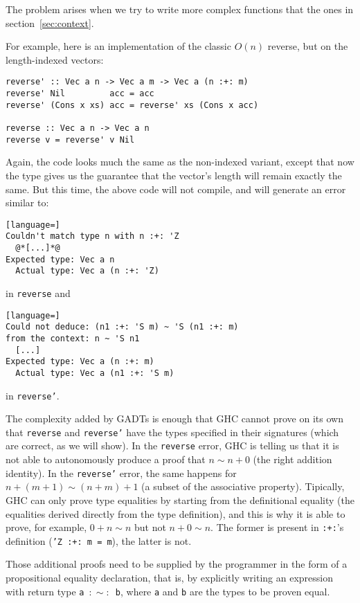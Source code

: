 The problem arises when we try to write more complex functions that the ones in section~\ref{sec:context}.

For example, here is an implementation of the classic $O(n)$ reverse, but on the length-indexed vectors:

\begin{lstlisting}
reverse' :: Vec a n -> Vec a m -> Vec a (n :+: m)
reverse' Nil         acc = acc
reverse' (Cons x xs) acc = reverse' xs (Cons x acc)

reverse :: Vec a n -> Vec a n
reverse v = reverse' v Nil
\end{lstlisting}

Again, the code looks much the same as the non-indexed variant, except that now the type gives us the guarantee that the vector's length will remain exactly the same.
But this time, the above code will not compile, and will generate an error similar to:

\begin{lstlisting}[language=]
Couldn't match type n with n :+: 'Z
  @*[...]*@
Expected type: Vec a n
  Actual type: Vec a (n :+: 'Z)
\end{lstlisting}

in \texttt{reverse} and

\begin{lstlisting}[language=]
Could not deduce: (n1 :+: 'S m) ~ 'S (n1 :+: m)
from the context: n ~ 'S n1
  [...]
Expected type: Vec a (n :+: m)
  Actual type: Vec a (n1 :+: 'S m)
\end{lstlisting}

in \texttt{reverse'}.

The complexity added by GADTs is enough that GHC cannot prove on its own that \texttt{reverse} and \texttt{reverse'} have the types specified in their signatures (which are correct, as we will show).
In the \texttt{reverse} error, GHC is telling us that it is not able to autonomously produce a proof that $n \sim n+0$ (the right addition identity).
In the \texttt{reverse'} error, the same happens for $n+(m+1) \sim (n+m)+1$ (a subset of the associative property).
Tipically, GHC can only prove type equalities by starting from the definitional equality (the equalities derived directly from the type definition), and this is why it is able to prove, for example, $0+n \sim n$ but not $n+0 \sim n$. The former is present in \texttt{:+:}'s definition (\texttt{'Z :+: m = m}), the latter is not.

Those additional proofs need to be supplied by the programmer in the form of a propositional equality declaration, that is, by explicitly writing an expression with return type \texttt{a $:\sim:$ b}, where \texttt{a} and \texttt{b} are the types to be proven equal.


